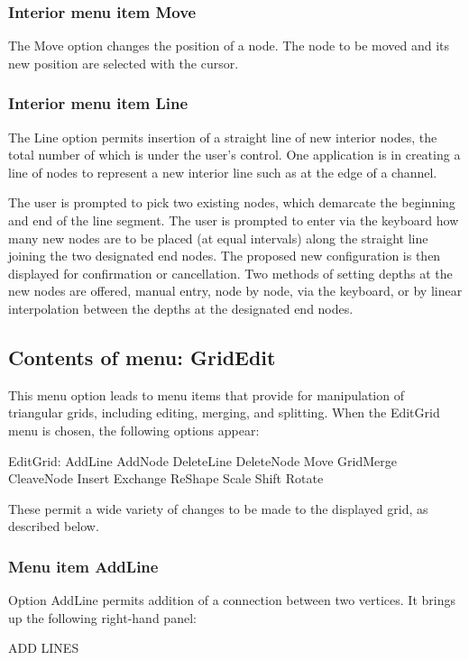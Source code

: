\documentclass{article}
\begin{document}
\subsubsection[Interior menu item Move]{Interior menu item Move}
The Move option changes the position of a node. The node to be moved and its new position are selected with the cursor.

\subsubsection[Interior menu item Line]{Interior menu item Line}
The Line option permits insertion of a straight line of new interior nodes, the total number of which is under the user's control. One application is in creating a line of nodes to represent a new interior line such as at the edge of a channel.

The user is prompted to pick two existing nodes, which demarcate the beginning and end of the line segment. The user is prompted to enter via the keyboard how many new nodes are to be placed (at equal intervals) along the straight line joining the two designated end nodes. The proposed new configuration is then displayed for confirmation or cancellation. Two methods of setting depths at the new nodes are offered, manual entry, node by node, via the keyboard, or by linear interpolation between the depths at the designated end nodes.

\subsection{Contents of menu: GridEdit}
This menu option leads to menu items that provide for manipulation of triangular grids, including editing, merging, and splitting. When the EditGrid menu is chosen, the following options appear:

EditGrid: AddLine AddNode DeleteLine DeleteNode Move GridMerge {\textbar} CleaveNode Insert Exchange ReShape {\textbar} Scale Shift Rotate

These permit a wide variety of changes to be made to the displayed grid, as described below.

\subsubsection[Menu item AddLine]{Menu item AddLine}
Option AddLine permits addition of a connection between two vertices. It brings up the following right-hand panel:

ADD LINES
\end{document}
